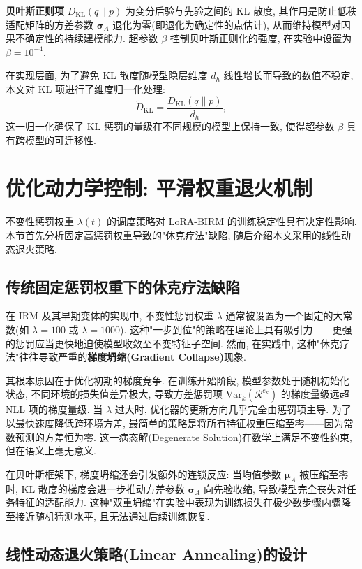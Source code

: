 \documentclass[a4paper,punct=banjiao,twoside]{ctexrep}
\theoremstyle{plain}
\theoremstyle{definition}
\theoremstyle{remark}
\begin{document}
\textbf{贝叶斯正则项} $D_{\text{KL}}(q \| p)$ 为变分后验与先验之间的 KL 散度, 其作用是防止低秩适配矩阵的方差参数 $\boldsymbol{\sigma}_A$ 退化为零(即退化为确定性的点估计), 从而维持模型对因果不确定性的持续建模能力. 超参数 $\beta$ 控制贝叶斯正则化的强度, 在实验中设置为 $\beta = 10^{-4}$.

在实现层面, 为了避免 KL 散度随模型隐层维度 $d_h$ 线性增长而导致的数值不稳定, 本文对 KL 项进行了维度归一化处理:
\begin{equation}
    \tilde{D}_{\text{KL}} = \frac{D_{\text{KL}}(q \| p)}{d_h},
\end{equation}
这一归一化确保了 KL 惩罚的量级在不同规模的模型上保持一致, 使得超参数 $\beta$ 具有跨模型的可迁移性.

\section{优化动力学控制: 平滑权重退火机制}

不变性惩罚权重 $\lambda(t)$ 的调度策略对 LoRA-BIRM 的训练稳定性具有决定性影响. 本节首先分析固定高惩罚权重导致的"休克疗法"缺陷, 随后介绍本文采用的线性动态退火策略.

\subsection{传统固定惩罚权重下的休克疗法缺陷}

在 IRM 及其早期变体的实现中, 不变性惩罚权重 $\lambda$ 通常被设置为一个固定的大常数(如 $\lambda = 100$ 或 $\lambda = 1000$). 这种"一步到位"的策略在理论上具有吸引力——更强的惩罚应当更快地迫使模型收敛至不变特征子空间. 然而, 在实践中, 这种"休克疗法"往往导致严重的\textbf{梯度坍缩(Gradient Collapse)}现象.

其根本原因在于优化初期的梯度竞争. 在训练开始阶段, 模型参数处于随机初始化状态, 不同环境的损失值差异极大, 导致方差惩罚项 $\text{Var}_k(\mathcal{R}^{e_k})$ 的梯度量级远超 NLL 项的梯度量级. 当 $\lambda$ 过大时, 优化器的更新方向几乎完全由惩罚项主导. 为了以最快速度降低跨环境方差, 最简单的策略是将所有特征权重压缩至零——因为常数预测的方差恒为零. 这一病态解(Degenerate Solution)在数学上满足不变性约束, 但在语义上毫无意义.

在贝叶斯框架下, 梯度坍缩还会引发额外的连锁反应: 当均值参数 $\boldsymbol{\mu}_A$ 被压缩至零时, KL 散度的梯度会进一步推动方差参数 $\boldsymbol{\sigma}_A$ 向先验收缩, 导致模型完全丧失对任务特征的适配能力. 这种"双重坍缩"在实验中表现为训练损失在极少数步骤内骤降至接近随机猜测水平, 且无法通过后续训练恢复.

\subsection{线性动态退火策略(Linear Annealing)的设计}
\end{document}
